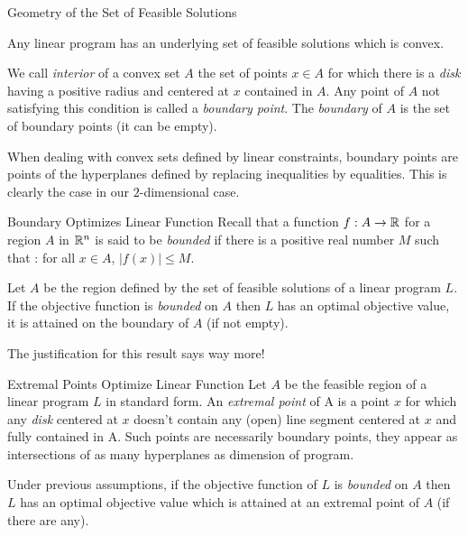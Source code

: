 \documentclass[aspectratio = 169]{beamer}
\begin{document}
\begin{frame}{Geometry of the Set of Feasible Solutions}
  \begin{prop}
    Any linear program has an underlying set of feasible solutions
    which is convex.
  \end{prop}
  \begin{defn}
    We call \emph{interior} of a convex set $A$ the set of points
    $x \in A$ for which there is a \textit{disk} having a positive
    radius and centered at $x$ contained in $A$. Any point of $A$ not
    satisfying this condition is called a \emph{boundary point}. The
    \emph{boundary} of $A$ is the set of boundary points (it can be
    empty).
  \end{defn}
  When dealing with convex sets defined by linear constraints,
  boundary points are points of the hyperplanes defined by replacing
  inequalities by equalities. This is clearly the case in our
  $2$-dimensional case.
\end{frame}

\begin{frame}{Boundary Optimizes Linear Function}
  Recall that a function $f : A \to \mathbb{R}$ for a region $A$ in $\mathbb{R}^n$ is
  said to be \emph{bounded} if there is a positive real number $M$
  such that : for all $x \in A$, $\big|f(x)\big| \leq M$.
  \begin{prop}
    Let $A$ be the region defined by the set of feasible solutions of
    a linear program $L$. If the objective function is
    \textit{bounded} on $A$ then $L$ has an optimal objective value,
    it is attained on the boundary of $A$ (if not empty).
  \end{prop}
  The justification for this result says way more!
\end{frame}

\begin{frame}{Extremal Points Optimize Linear Function}
  Let $A$ be the feasible region of a linear program $L$ in standard
  form. An \emph{extremal point} of A is a point $x$ for which any
  \textit{disk} centered at $x$ doesn't contain any (open) line
  segment centered at $x$ and fully contained in A. \pause Such points
  are necessarily boundary points, they appear as intersections of as
  many hyperplanes as dimension of program. \pause
  \begin{prop}
    Under previous assumptions, if the objective function of $L$ is
    \textit{bounded} on $A$ then $L$ has an optimal objective value
    which is attained at an extremal point of $A$ (if there are any).
    \end{prop}
\end{frame}
\end{document}
